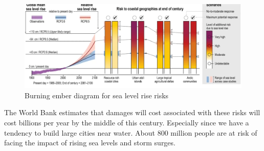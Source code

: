 \documentclass[../summary.tex]{subfiles}
\begin{document}
					\begin{figure}[h]
						\centering
						\includegraphics[width=0.9\linewidth]{../images/1-sea-rise-risk.png}
						\caption{Burning ember diagram for sea level rise risks}
						\label{fig:1-sea-rise-risk}
					\end{figure}
					
					The World Bank estimates that damages will cost associated with these risks will cost billions per year by the middle of this century. Especially since we have a tendency to build large cities near water. About 800 million people are at risk of facing the impact of rising sea levels and storm surges. 
	
\end{document}
